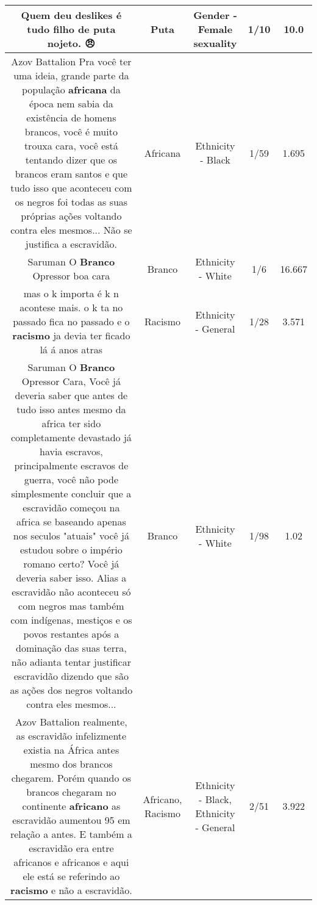 \documentclass[11pt]{article}
\newlength\mylength
\begin{document}
\begin{center}
\begin{longtable}{|C{.65\mylength}|C{.30\mylength}|C{.12\mylength}|C{.12\mylength}|C{.12\mylength}|}
  \small Quem deu deslikes é tudo filho de \textbf{puta} nojeto. 😠\normalsize   & Puta & Gender - Female sexuality & 1/10 & 10.0 \\  \hline
  \small Azov Battalion Pra você ter uma ideia, grande parte da população \textbf{africana} da época nem sabia da existência de homens brancos, você é muito trouxa cara, você está tentando dizer que os brancos eram santos e que tudo isso que aconteceu com os negros foi todas as suas próprias ações voltando contra eles mesmos... Não se justifica a escravidão.\normalsize   & Africana & Ethnicity - Black & 1/59 & 1.695 \\  \hline
  \small Saruman O \textbf{Branco} Opressor boa cara\normalsize   & Branco & Ethnicity - White & 1/6 & 16.667 \\  \hline
  \small mas o k importa é k n acontese mais. o k ta no passado fica no passado e o \textbf{racismo} ja devia ter ficado lá á anos atras\normalsize   & Racismo & Ethnicity - General & 1/28 & 3.571 \\  \hline
  \small Saruman O \textbf{Branco} Opressor Cara, Você já deveria saber que antes de tudo isso antes mesmo da africa ter sido completamente devastado já havia escravos, principalmente escravos de guerra, você não pode simplesmente concluir que a escravidão começou na africa se baseando apenas nos seculos "atuais" você já estudou sobre o império romano certo? Você já deveria saber isso. Alias a escravidão não aconteceu só com negros mas também com indígenas, mestiços e os povos restantes após a dominação das suas terra, não adianta tentar justificar escravidão dizendo que são as ações dos negros voltando contra eles mesmos...\normalsize   & Branco & Ethnicity - White & 1/98 & 1.02 \\  \hline
  \small Azov Battalion realmente, as escravidão infelizmente existia na África antes mesmo dos brancos chegarem. Porém quando os brancos chegaram no continente \textbf{africano} as escravidão aumentou 95 em relação a antes. E também a escravidão era entre africanos e africanos e aqui ele está se referindo ao \textbf{racismo} e não a escravidão.\normalsize   & Africano, Racismo & Ethnicity - Black, Ethnicity - General & 2/51 & 3.922 \\  \hline

\end{longtable}
\end{center}
\end{document}
